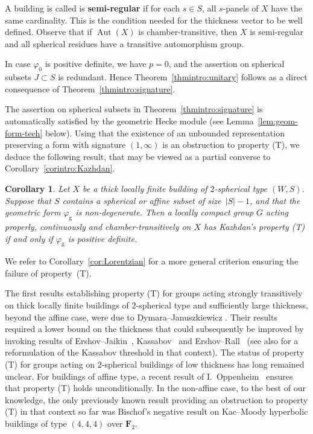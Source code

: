 \documentclass[12pt,a4paper]{amsproc}
\newtheorem{corintro}[thmintro]{Corollary}
\theoremstyle{definition}
\DeclareMathOperator{\Aut}{Aut}
\newcommand{\rg}{\mathrm g}
\begin{document}
 A building is called is \textbf{semi-regular} if  for each $s \in S$, all $s$-panels of $X$ have the same cardinality. This is the condition needed for the thickness vector to be well defined. Observe that if $\Aut(X)$ is chamber-transitive, then $X$ is semi-regular and all spherical residues have a transitive automorphism group. 
 
 
In case $\varphi_0$ is positive definite, we have $p =0$, and the  assertion on spherical subsets  $J  \subset S$  is redundant. Hence Theorem~\ref{thmintro:unitary} follows as a direct consequence of Theorem~\ref{thmintro:signature}. 
 
The   assertion  on spherical subsets in Theorem~\ref{thmintro:signature} is automatically satisfied by the geometric Hecke module  (see Lemma~\ref{lem:geom-form-tech} below). Using that the existence of an unbounded representation preserving a form with signature $(1, \infty)$ is an obstruction to property (T), we   deduce the following result, that may be viewed as a partial converse to Corollary~\ref{corintro:Kazhdan}.
 

\begin{corintro}\label{corintro:non-Kazhdan}
Let $X$ be a thick locally finite building of $2$-spherical type $(W, S)$. Suppose that  $S$ contains a spherical or affine subset of size~$|S|-1$, and that the geometric form $\varphi_\rg$ is non-degenerate. Then  a locally compact group $G$ acting properly, continuously and chamber-transitively on $X$ has Kazhdan's property (T) if and only if $\varphi_{\mathrm{g}}$ is positive definite.
\end{corintro}

We refer to  Corollary~\ref{cor:Lorentzian} for a  more general criterion ensuring the failure of property~(T).

The first results establishing property (T) for groups acting strongly transitively on thick locally finite buildings of $2$-spherical type and sufficiently large thickness, beyond the affine case, were due to Dymara--Januszkiewicz \cite{DymJan}. Their results required a lower bound on the thickness that could subsequently be improved by invoking results of Ershov--Jaikin~\cite{EJ},  Kassabov~\cite{Ka11}  and Ershov--Rall~\cite{ErshovRall} (see also \cite{GriOpp} for a reformulation of the Kassabov threshold in that context). The status of property (T) for groups acting on $2$-spherical buildings of low thickness has long remained unclear. For buildings of affine type, a recent result of I.~Oppenheim~\cite{Oppenheim} ensures that property (T) holds unconditionally. In the non-affine case, to the best of our knowledge, the only previously known result providing an obstruction to property (T) in that context  so far was Bischof's negative result \cite[Lemma~7.4.6]{BischofThesis} on Kac--Moody hyperbolic buildings of type $(4, 4, 4)$ over $\mathbf F_2$.
\medskip 
\end{document}
